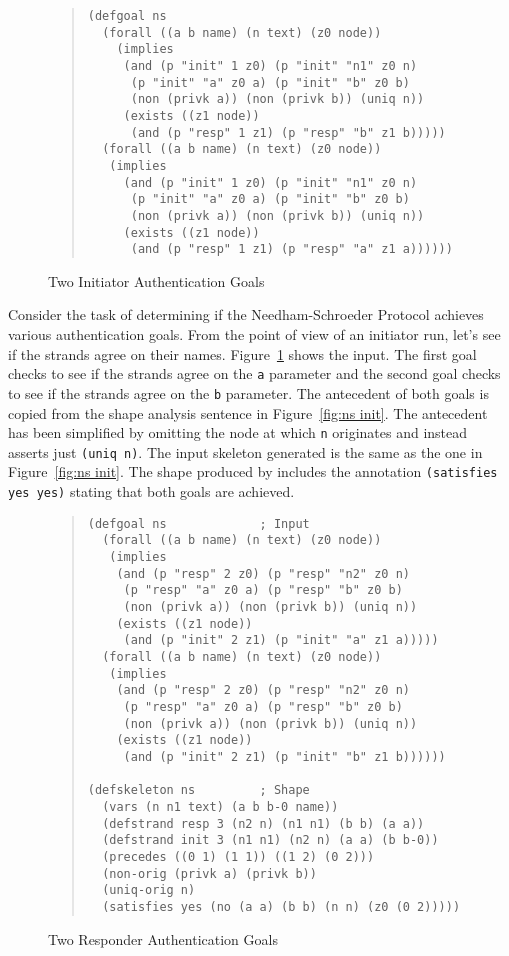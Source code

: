 \documentclass[12pt]{article}
\begin{document}
\begin{figure}
\begin{quote}
\begin{verbatim}
(defgoal ns
  (forall ((a b name) (n text) (z0 node))
    (implies
     (and (p "init" 1 z0) (p "init" "n1" z0 n)
      (p "init" "a" z0 a) (p "init" "b" z0 b)
      (non (privk a)) (non (privk b)) (uniq n))
     (exists ((z1 node))
      (and (p "resp" 1 z1) (p "resp" "b" z1 b)))))
  (forall ((a b name) (n text) (z0 node))
   (implies
     (and (p "init" 1 z0) (p "init" "n1" z0 n)
      (p "init" "a" z0 a) (p "init" "b" z0 b)
      (non (privk a)) (non (privk b)) (uniq n))
     (exists ((z1 node))
      (and (p "resp" 1 z1) (p "resp" "a" z1 a))))))
\end{verbatim}
\end{quote}
\caption{Two Initiator Authentication Goals}\label{fig:ns init goals}
\end{figure}

Consider the task of determining if the Needham-Schroeder Protocol
achieves various authentication goals.  From the point of view of an
initiator run, let's see if the strands agree on their names.
Figure~\ref{fig:ns init goals} shows the input.  The first goal checks
to see if the strands agree on the \texttt{a} parameter and the second
goal checks to see if the strands agree on the \texttt{b} parameter.
The antecedent of both goals is copied from the shape analysis
sentence in Figure~\ref{fig:ns init}.  The antecedent has been
simplified by omitting the node at which \texttt{n} originates and
instead asserts just \texttt{(uniq n)}.  The input skeleton generated
is the same as the one in Figure~\ref{fig:ns init}.  The shape
produced by {\cpsa} includes the annotation \texttt{(satisfies yes
  yes)} stating that both goals are achieved.

\begin{figure}
\begin{quote}
\begin{verbatim}
(defgoal ns             ; Input
  (forall ((a b name) (n text) (z0 node))
   (implies
    (and (p "resp" 2 z0) (p "resp" "n2" z0 n)
     (p "resp" "a" z0 a) (p "resp" "b" z0 b)
     (non (privk a)) (non (privk b)) (uniq n))
    (exists ((z1 node))
     (and (p "init" 2 z1) (p "init" "a" z1 a)))))
  (forall ((a b name) (n text) (z0 node))
   (implies
    (and (p "resp" 2 z0) (p "resp" "n2" z0 n)
     (p "resp" "a" z0 a) (p "resp" "b" z0 b)
     (non (privk a)) (non (privk b)) (uniq n))
    (exists ((z1 node))
     (and (p "init" 2 z1) (p "init" "b" z1 b))))))

(defskeleton ns         ; Shape
  (vars (n n1 text) (a b b-0 name))
  (defstrand resp 3 (n2 n) (n1 n1) (b b) (a a))
  (defstrand init 3 (n1 n1) (n2 n) (a a) (b b-0))
  (precedes ((0 1) (1 1)) ((1 2) (0 2)))
  (non-orig (privk a) (privk b))
  (uniq-orig n)
  (satisfies yes (no (a a) (b b) (n n) (z0 (0 2)))))
\end{verbatim}
\end{quote}
\caption{Two Responder Authentication Goals}\label{fig:ns resp goals}
\end{figure}
\end{document}

